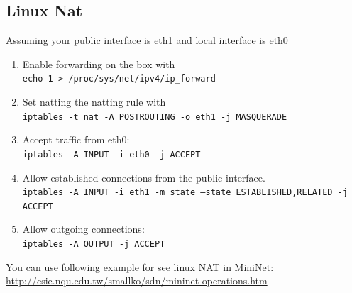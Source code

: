 \documentclass[10pt,a4paper]{article}
\numberwithin{equation}{section}
\numberwithin{figure}{section}
\numberwithin{table}{section}
\begin{document}
\subsection{Linux Nat}
Assuming your public interface is eth1 and local interface is eth0
\begin{enumerate}
    \item Enable forwarding on the box with\\
    \texttt{echo 1 > /proc/sys/net/ipv4/ip\_forward}
    \item Set natting the natting rule with\\
    \texttt{iptables -t nat -A POSTROUTING -o eth1 -j MASQUERADE}
    \item Accept traffic from eth0:\\
    \texttt{iptables -A INPUT -i eth0 -j ACCEPT}
    \item Allow established connections from the public interface.\\
    \texttt{iptables -A INPUT -i eth1 -m state --state ESTABLISHED,RELATED -j ACCEPT}
    \item Allow outgoing connections:\\
    \texttt{iptables -A OUTPUT -j ACCEPT}
\end{enumerate}

You can use following example for see linux NAT in MiniNet:\\
\href{http://csie.nqu.edu.tw/smallko/sdn/mininet-operations.htm}{http://csie.nqu.edu.tw/smallko/sdn/mininet-operations.htm}
\end{document}
